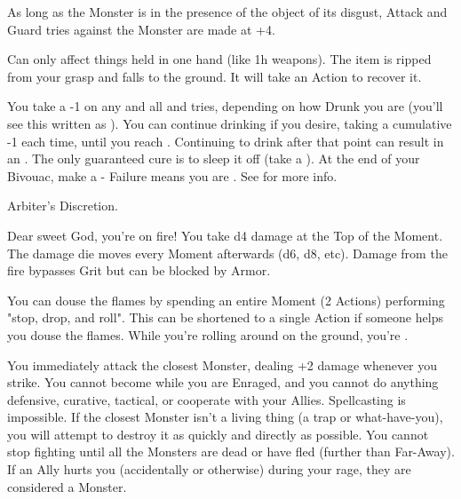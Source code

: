 \begin{multicols*}{2}
   As long as the Monster is in the presence of the object of its disgust, Attack and Guard tries against the Monster are made at +4.


  Can only affect things held in one hand (like 1h weapons). The item is ripped from your grasp and falls to the ground.  It will take an Action to recover it.

  
  You take a -1 on any and all \RO and \RB tries, depending on how Drunk you are (you'll see this written as ).  You can continue drinking if you desire, taking a cumulative -1 each time, until you reach . Continuing to drink after that point can result in an .  The only guaranteed cure is to sleep it off (take a ).  At the end of your Bivouac, make a \RSTRY{\VIG} - Failure means you are . See  for more info. 

    Arbiter's Discretion.


  Dear sweet God, you're on fire! You take d4 damage at the Top of the Moment. The damage die moves \DCUP every Moment afterwards (d6, d8, etc). Damage from the fire bypasses Grit but can be blocked by Armor.

You can douse the flames by spending an entire Moment (2 Actions) performing "stop, drop, and roll".  This can be shortened to a single Action if someone helps you douse the flames. While you're rolling around on the ground, you're .



  You immediately attack the closest Monster, dealing +2 damage whenever you strike. You cannot become  while you are Enraged, and you cannot do anything defensive, curative, tactical, or cooperate with your Allies. Spellcasting is impossible. If the closest Monster isn't a living thing (a trap or what-have-you), you will attempt to destroy it as quickly and directly as possible. You cannot stop fighting until all the Monsters are dead or have fled (further than Far-Away).  If an Ally hurts you (accidentally or otherwise) during your rage, they are considered a Monster.


\end{multicols*}
